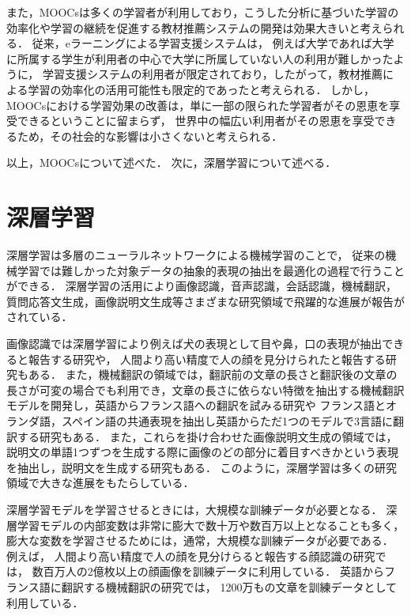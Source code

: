 また，MOOCsは多くの学習者が利用しており，こうした分析に基づいた学習の効率化や学習の継続を促進する教材推薦システムの開発は効果大きいと考えられる．
従来，eラーニングによる学習支援システムは，
例えば大学であれば大学に所属する学生が利用者の中心で大学に所属していない人の利用が難しかったように，
学習支援システムの利用者が限定されており，したがって，教材推薦による学習の効率化の活用可能性も限定的であったと考えられる．
しかし，MOOCsにおける学習効果の改善は，単に一部の限られた学習者がその恩恵を享受できるということに留まらず，
世界中の幅広い利用者がその恩恵を享受できるため，その社会的な影響は小さくないと考えられる．


\vvspace
以上，MOOCsについて述べた．
次に，深層学習について述べる．


\section{深層学習}
深層学習は多層のニューラルネットワークによる機械学習のことで，
従来の機械学習では難しかった対象データの抽象的表現の抽出を最適化の過程で行うことができる．
深層学習の活用により画像認識\cite{schroff2015facenet,szegedy2014going}，音声認識\cite{hinton2012deep, bahdanau2015end}，会話認識\cite{sak2015fast}，機械翻訳\cite{sutskever2014sequence, dong2015multi}，質問応答文生成\cite{yin2015neural}，画像説明文生成\cite{xu2015show,vinyals2014show}等さまざまな研究領域で飛躍的な進展が報告がされている．

画像認識では深層学習により例えば犬の表現として目や鼻，口の表現が抽出できると報告する研究\cite{zeiler2014visualizing}や，
人間より高い精度で人の顔を見分けられたと報告する研究\cite{schroff2015facenet}もある．
また，機械翻訳の領域では，翻訳前の文章の長さと翻訳後の文章の長さが可変の場合でも利用でき，文章の長さに依らない特徴を抽出する機械翻訳モデルを開発し，英語からフランス語への翻訳を試みる研究\cite{sutskever2014sequence}や
フランス語とオランダ語，スペイン語の共通表現を抽出し英語からただ1つのモデルで3言語に翻訳する研究もある\cite{dong2015multi}．
また，これらを掛け合わせた画像説明文生成の領域では，説明文の単語1つずつを生成する際に画像のどの部分に着目すべきかという表現を抽出し，説明文を生成する研究\cite{xu2015show}もある．
このように，深層学習は多くの研究領域で大きな進展をもたらしている．

深層学習モデルを学習させるときには，大規模な訓練データが必要となる．
深層学習モデルの内部変数は非常に膨大で数十万や数百万以上となることも多く，
膨大な変数を学習させるためには，通常，大規模な訓練データが必要である．
例えば，
人間より高い精度で人の顔を見分けらると報告する顔認識の研究\cite{schroff2015facenet}では，
数百万人の2億枚以上の顔画像を訓練データに利用している．
英語からフランス語に翻訳する機械翻訳の研究\cite{xu2015show}では，
1200万もの文章を訓練データとして利用している．



